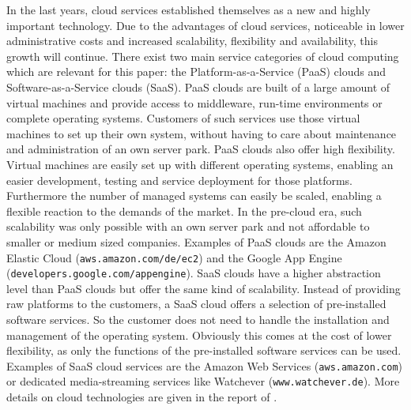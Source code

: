 \documentclass{llncs}
\begin{document}
In the last years, cloud services established themselves as a new and highly important technology. Due to the advantages of cloud services, noticeable in lower administrative costs and increased scalability, flexibility and availability, this growth will continue. There exist two main service categories of cloud computing which are relevant for this paper: the Platform-as-a-Service (PaaS) clouds and Software-as-a-Service clouds (SaaS). PaaS clouds are built of a large amount of virtual machines and provide access to middleware, run-time environments or complete operating systems. Customers of such services use those virtual machines to set up their own system, without having to care about maintenance and administration of an own server park. PaaS clouds also offer high flexibility. Virtual machines are easily set up with different operating systems, enabling an easier development, testing and service deployment for those platforms. Furthermore the number of managed systems can easily be scaled, enabling a flexible reaction to the demands of the market. In the pre-cloud era, such scalability was only possible with an own server park and not affordable to smaller or medium sized companies. Examples of PaaS clouds are the Amazon Elastic Cloud (\texttt{aws.amazon.com/de/ec2}) and the Google App Engine (\texttt{developers.google.com/appengine}). SaaS clouds have a higher abstraction level than PaaS clouds but offer the same kind of scalability. Instead of providing raw platforms to the customers, a SaaS cloud offers a selection of pre-installed software services. So the customer does not need to handle the installation and management of the operating system. Obviously this comes at the cost of lower flexibility, as only the functions of the pre-installed software services can be used. Examples of SaaS cloud services are the Amazon Web Services (\texttt{aws.amazon.com}) or dedicated media-streaming services like Watchever (\texttt{www.watchever.de}). More details on cloud technologies are given in the report of \cite{CSA13.1}. 
\end{document}
